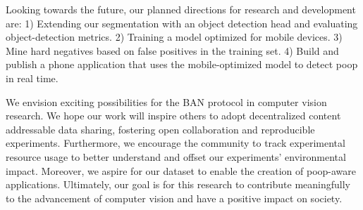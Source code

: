 \documentclass[10pt,twocolumn,letterpaper]{article}
\newif\ifnonanonymous
\begin{document}
Looking towards the future, our planned directions for research and development are:
1) Extending our segmentation with an object detection head and evaluating object-detection metrics.
2) Training a model optimized for mobile devices.
3) Mine hard negatives based on false positives in the training set.
4) Build and publish a phone application that uses the mobile-optimized model to detect poop in real time.

We envision exciting possibilities for the BAN protocol in computer vision research.
We hope our work will inspire others to adopt decentralized content addressable data sharing, fostering open
  collaboration and reproducible experiments.
Furthermore, we encourage the community to track experimental resource usage to better understand and offset
  our experiments' environmental impact.
Moreover, we aspire for our dataset to enable the creation of poop-aware applications.
Ultimately, our goal is for this research to contribute meaningfully to the advancement of computer vision
  and have a positive impact on society.
  
  
\ifnonanonymous
\section{Acknowledgements}
We would would like to thank all of the dogs that produced subject matter for the dataset, all of the
  contributors for helping to construct a challenging test set, and Anthony Hoogs for several suggestions including taking the 
  third negative picture.
\fi

{\small


}



%
\end{document}
